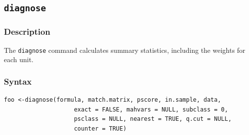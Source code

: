 \documentclass[oneside,letterpaper,titlepage]{article}
\begin{document}
\begin{appendix}
\subsection{\texttt{diagnose}}

\subsubsection{Description}
The \texttt{diagnose} command calculates summary statistics, including the weights for each unit. 

\subsubsection{Syntax}
\begin{verbatim}
foo <-diagnose(formula, match.matrix, pscore, in.sample, data,
                    exact = FALSE, mahvars = NULL, subclass = 0,
                    psclass = NULL, nearest = TRUE, q.cut = NULL,
                    counter = TRUE)
\end{verbatim} 


\end{appendix}
\end{document}
